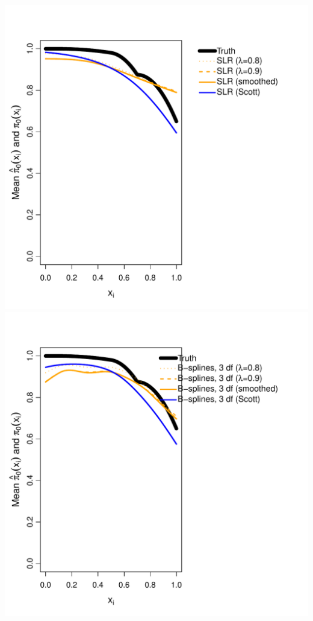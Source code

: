 \documentclass{article}\usepackage[]{graphicx}\usepackage[]{color}
\makeatletter
\def\maxwidth{ %
  \ifdim\Gin@nat@width>\linewidth
    \linewidth
  \else
    \Gin@nat@width
  \fi
}
\newenvironment{knitrout}{}{} %
\makeatother
\begin{document}
\begin{knitrout}
{\includegraphics[width=\maxwidth]{Figures/unnamed-chunk-1-9} 
\includegraphics[width=\maxwidth]{Figures/unnamed-chunk-1-10} 
}
\end{knitrout}
\end{document}
